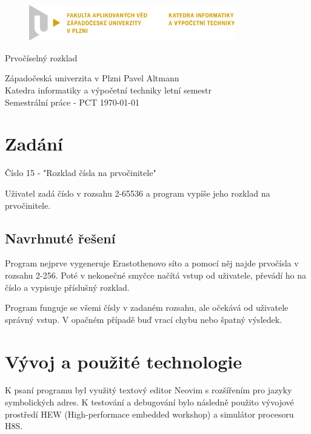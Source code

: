 \documentclass[12pt]{article}
\begin{document}
\begin{figure}[h!]
	\centering
	\includegraphics[width=0.8\textwidth]{pic/LOGO_KIV_CMYK.png}
\end{figure}

\begin{center}
	\vspace{.5cm}
	\LARGE{Prvočíselný rozklad}\\
\end{center}

\vfill

\noindent
Západočeská univerzita v Plzni \hfill Pavel Altmann\\
Katedra informatiky a výpočetní techniky \hfill letní semestr\\
Semestrální práce - PCT \hfill \today
\thispagestyle{empty}

\newpage
\setcounter{page}{1}

\tableofcontents

\newpage

\section{Zadání}

Číslo 15 - "Rozklad čísla na prvočinitele"

Uživatel zadá číslo v rozsahu 2-65536 a program vypíše jeho rozklad na
prvočinitele.

\subsection{Navrhnuté řešení}

Program nejprve vygeneruje Erastothenovo síto a pomocí něj najde prvočísla v
rozsahu 2-256. Poté v nekonečné smyčce načítá vstup od uživatele, převádí ho na
číslo a vypisuje příslušný rozklad.

Program funguje se všemi čísly v zadaném rozsahu, ale očekává od uživatele
správný vstup. V opačném případě buď vrací chybu nebo špatný výsledek.

\section{Vývoj a použité technologie}

K psaní programu byl využitý textový editor Neovim s rozšířením pro jazyky
symbolických adres. K testování a debugování bylo následně použito vývojové
prostředí HEW (High-performace embedded workshop) a simulátor procesoru H8S.
\end{document}

